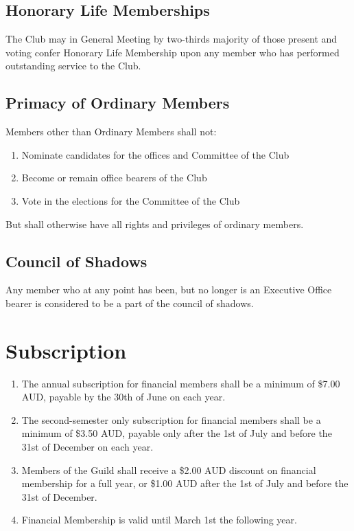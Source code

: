 \documentclass[10pt,a4paper]{report}
\begin{document}
		\subsection{Honorary Life Memberships}
			The Club may in General Meeting by two-thirds majority of those present and voting confer Honorary Life Membership upon any member who has performed outstanding service to the Club.

		\subsection{Primacy of Ordinary Members}
		Members other than Ordinary Members shall not:
		\begin{enumerate}[label=\alph*]
			\item Nominate candidates for the offices and Committee of the Club
			\item Become or remain office bearers of the Club
			\item Vote in the elections for the Committee of the Club
		\end{enumerate}
		But shall otherwise have all rights and privileges of ordinary members.
		\subsection{Council of Shadows}
		Any member who at any point has been, but no longer is an Executive Office bearer is considered to be a part of the council of shadows.
	\section{Subscription}

		\begin{enumerate}[label=\alph*]
			\item The annual subscription for financial members shall be a minimum of \$7.00 AUD, payable by the 30th of June on each year.

			\item The second-semester only subscription for financial members shall be a minimum of \$3.50 AUD, payable only after the 1st of July and before the 31st of December on each year.

			\item Members of the Guild shall receive a \$2.00 AUD discount on financial membership for a full year, or \$1.00 AUD after the 1st of July and before the 31st of December.

			\item Financial Membership is valid until March 1st the following year.
		\end{enumerate}
\end{document}
